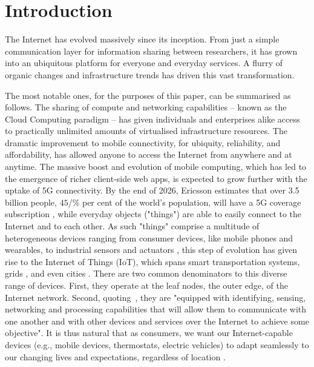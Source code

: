 \section{Introduction}
\label{sec:introduction}

The Internet has evolved massively since its inception. From just a simple communication layer for information sharing between researchers, it has grown into an ubiquitous platform for everyone and everyday services. 
A flurry of organic changes and infrastructure trends has driven this vast transformation.

The most notable ones, for the purposes of this paper, can be summarised as follows.
The sharing of compute and networking capabilities -- known as the Cloud Computing paradigm -- has given individuals and enterprises alike access to practically unlimited amounts of virtualised infrastructure resources. 
The dramatic improvement to mobile connectivity, for ubiquity, reliability, and affordability, has allowed anyone to access the Internet from anywhere and at anytime.
The massive boost and evolution of mobile computing, which has led to the emergence of richer client-side web apps, is expected to grow further with the uptake of 5G connectivity.
By the end of 2026, Ericsson estimates that over 3.5 billion people,  $45$/\% per cent of the world's population, will have a 5G coverage subscription \cite{ericsson-5g}, while
everyday objects ("things") are able to easily  connect to the Internet and to each other. 
As such "things" comprise a multitude of heterogeneous devices ranging from consumer devices, like mobile phones and wearables, to industrial sensors and actuators \cite{chen2018edge}, this step of evolution has given rise to the Internet of Things (IoT), which spans 
smart transportation systems, grids \cite{mugarza2019dynamic}, and even cities \cite{mitton2012combining}.
There are two common denominators to this diverse range of devices. First, they operate at the leaf nodes, the outer edge, of the Internet network. 
Second, quoting~\cite{whitmore2015internet}, they are "equipped with identifying, sensing, networking and processing capabilities that will allow them to communicate with one another and with other devices and services over the Internet to achieve some objective".
It is thus natural that as consumers, we want our Internet-capable devices (e.g., mobile devices, thermostats, electric vehicles) to adapt seamlessly to our changing lives and expectations, regardless of location \cite{beckman2020harnessing}.

